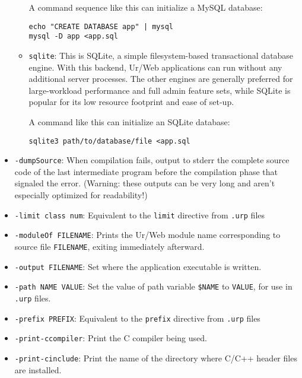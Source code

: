 \documentclass{article}
\begin{document}
\begin{itemize}
\begin{itemize}
    A command sequence like this can initialize a MySQL database:
    \begin{verbatim}
echo "CREATE DATABASE app" | mysql
mysql -D app <app.sql
    \end{verbatim}

  \item \texttt{sqlite}: This is SQLite, a simple filesystem-based transactional database engine.  With this backend, Ur/Web applications can run without any additional server processes.  The other engines are generally preferred for large-workload performance and full admin feature sets, while SQLite is popular for its low resource footprint and ease of set-up.

    A command like this can initialize an SQLite database:
    \begin{verbatim}
sqlite3 path/to/database/file <app.sql
    \end{verbatim}
  \end{itemize}

\item \texttt{-dumpSource}: When compilation fails, output to stderr the complete source code of the last intermediate program before the compilation phase that signaled the error.  (Warning: these outputs can be very long and aren't especially optimized for readability!)

\item \texttt{-limit class num}: Equivalent to the \texttt{limit} directive from \texttt{.urp} files

\item \texttt{-moduleOf FILENAME}: Prints the Ur/Web module name corresponding to source file \texttt{FILENAME}, exiting immediately afterward.

\item \texttt{-output FILENAME}: Set where the application executable is written.

\item \texttt{-path NAME VALUE}: Set the value of path variable \texttt{\$NAME} to \texttt{VALUE}, for use in \texttt{.urp} files.

\item \texttt{-prefix PREFIX}: Equivalent to the \texttt{prefix} directive from \texttt{.urp} files

\item \texttt{-print-ccompiler}: Print the C compiler being used.

\item \texttt{-print-cinclude}: Print the name of the directory where C/C++ header files are installed.


\end{itemize}
\end{document}
